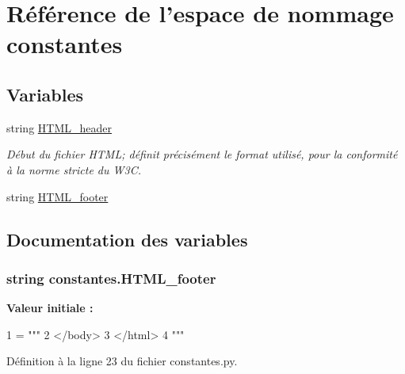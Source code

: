 \hypertarget{namespaceconstantes}{\section{Référence de l'espace de nommage constantes}
\label{namespaceconstantes}
}
\subsection*{Variables}
\begin{DoxyCompactItemize}
\item 
string \hyperlink{namespaceconstantes_a04524e30f424889c8a4407e02f93755f}{H\-T\-M\-L\-\_\-header}
\begin{DoxyCompactList}\small\item\em Début du fichier H\-T\-M\-L; définit précisément le format utilisé, pour la conformité à la norme stricte du W3\-C. \end{DoxyCompactList}\item 
string \hyperlink{namespaceconstantes_a43ef8a067f33f666e58da77fae47ecd4}{H\-T\-M\-L\-\_\-footer}
\end{DoxyCompactItemize}


\subsection{Documentation des variables}
\hypertarget{namespaceconstantes_a43ef8a067f33f666e58da77fae47ecd4}{
\subsubsection[{H\-T\-M\-L\-\_\-footer}]{\setlength{\rightskip}{0pt plus 5cm}string constantes.\-H\-T\-M\-L\-\_\-footer}}\label{namespaceconstantes_a43ef8a067f33f666e58da77fae47ecd4}
{\bfseries Valeur initiale \-:}
\begin{DoxyCode}
1 = \textcolor{stringliteral}{"""}
2 \textcolor{stringliteral}{</body>}
3 \textcolor{stringliteral}{</html>}
4 \textcolor{stringliteral}{"""}
\end{DoxyCode}


Définition à la ligne 23 du fichier constantes.\-py.

